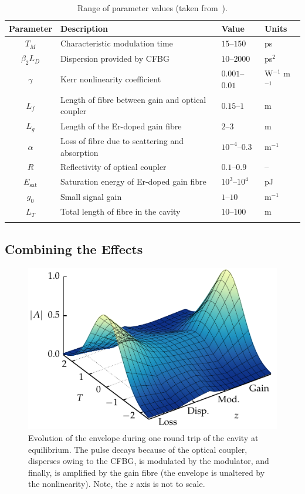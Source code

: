 \documentclass[9pt,twocolumn,twoside]{osajnl}
\newcommand{\Es}{E_{\textrm{sat}}} %
\begin{document}
\begin{table}[tbp]
	\centering
	\caption{Range of parameter values (taken from~\cite{agrawal2013, burgoyne2014, burgoyneemail, tamura1996, usechak2005}).}
 	\label{tab:values}
 	\begin{tabular}{clll}
		\hline
		Parameter & Description & Value & Units \\
		\hline\noalign{\smallskip}
		$T_M$ & Characteristic modulation time & $15$--$150$ & ps \\
		$\beta_2 L_D$ & Dispersion provided by CFBG & $10$--$2000$ & ps$^2$ \\
		$\gamma$ & Kerr nonlinearity coefficient & $0.001$--$0.01$ & W$^{-1}$ m$^{-1}$ \\
		$L_f$ & Length of fibre between gain and optical coupler & $0.15$--$1$ & m \\
		$L_g$ & Length of the Er-doped gain fibre & $2$--$3$ & m \\
		$\alpha$ & Loss of fibre due to scattering and absorption & $10^{-4}$--$0.3$ & m$^{-1}$ \\
		$R$ & Reflectivity of optical coupler & $0.1$--$0.9$ & -- \\
		$\Es$ & Saturation energy of Er-doped gain fibre & $10^3$--$10^4$ & pJ \\
		$g_0$ & Small signal gain &  $1$--$10$ & m$^{-1}$ \\
		$L_T$ & Total length of fibre in the cavity & $10$--$100$ & m \\
		\noalign{\smallskip}\hline
	\end{tabular}
\end{table}

\subsection{Combining the Effects}
\label{sec:effects}

\begin{figure}[tbp]
	\centering
	\includegraphics{Figures/Evo}
	\caption{Evolution of the envelope during one round trip of the cavity at equilibrium. The pulse decays because of the optical coupler, disperses owing to the CFBG, is modulated by the modulator, and finally, is amplified by the gain fibre (the envelope is unaltered by the nonlinearity). Note, the $z$ axis is not to scale.}
	\label{fig:cavityevo}
\end{figure}
\end{document}

